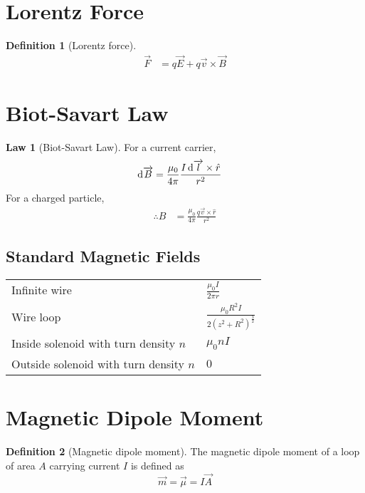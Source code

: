 \documentclass[fleqn, a4paper, 8pt, twoside]{amsart}
\theoremstyle{definition}
\newtheorem{definition}{Definition}
\theoremstyle{theorem}
\newtheorem{law}{Law}
\begin{document}
\begin{multicols}{2}
\begin{spacing}{0.6}
\section{Lorentz Force}

\begin{definition}[Lorentz force]
	\begin{align*}
		\overrightarrow{F} &= q \overrightarrow{E} + q \overrightarrow{v} \times \overrightarrow{B}
	\end{align*}
\end{definition}

\section{Biot-Savart Law}

\begin{law}[Biot-Savart Law]
	For a current carrier,
	\begin{align*}
		\dif \overrightarrow{B} & = \frac{\mu_0}{4 \pi} \frac{I \dif \overrightarrow{l} \times \hat{r}}{r^2}
	\end{align*}
	For a charged particle,
	\begin{align*}
		\therefore B            & = \frac{\mu_0}{4 \pi} \frac{q \overrightarrow{v} \times \hat{r}}{r^2}
	\end{align*}
	\label{Biot-Savart_Law}
\end{law}

\subsection{Standard Magnetic Fields}

\begin{tabular}{m{} m{}}
	Infinite wire & $\frac{\mu_0 I}{2 \pi r}$\\
	Wire loop & $\frac{\mu_0 R^2 I}{2 \left( z^2 + R^2 \right)^{\frac{3}{2}}}$\\
	Inside solenoid with turn density $n$ & $\mu_0 n I$\\
	Outside solenoid with turn density $n$ & $0$\\
\end{tabular}

\section{Magnetic Dipole Moment}

\begin{definition}[Magnetic dipole moment]
	The magnetic dipole moment of a loop of area $A$ carrying current $I$ is defined as
	\begin{equation*}
		\overrightarrow{m} = \overrightarrow{\mu} = I \overrightarrow{A}
	\end{equation*}
\end{definition}


\end{spacing}
\end{multicols}
\end{document}
